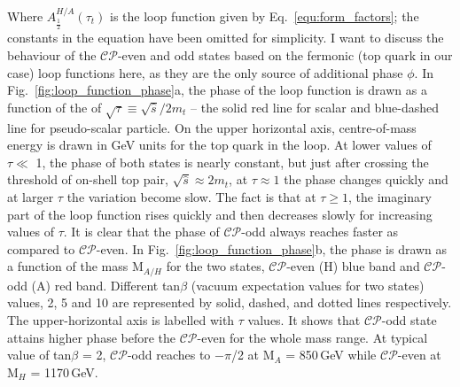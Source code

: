 Where $A^{H/A}_{\frac{1}{2}}(\tau_{t})$ is the loop function given by Eq.~\ref{equ:form_factors}; the constants in the equation have been omitted for simplicity. I want to discuss the behaviour of the $\mathcal{CP}$-even and odd states based on the fermonic (top quark in our case) loop functions here, as they are the only source of additional phase $\phi$. In Fig.~\ref{fig:loop_function_phase}a, the phase of the loop function is drawn as a function of the of $\sqrt{\tau}\equiv \sqrt{\hat{s}}/2m_{t}$ – the solid red line for scalar and blue-dashed line for pseudo-scalar particle. On the upper horizontal axis, centre-of-mass energy is drawn in GeV units for the top quark in the loop. At lower values of $\tau \ll$ 1, the phase of both states is nearly constant, but just after crossing the threshold of on-shell top pair, $\sqrt{\hat{s}} \approx 2m_{t}$, at $\tau\approx 1$ the phase changes quickly and at larger $\tau$ the variation become slow. The fact is that at $\tau\geq 1$, the imaginary part of the loop function rises quickly and then decreases slowly for increasing values of $\tau$. It is clear that the phase of $\mathcal{CP}$-odd always reaches faster as compared to $\mathcal{CP}$-even. In Fig.~\ref{fig:loop_function_phase}b, the phase is drawn as a function of the mass M$_{A/H}$ for the two states, $\mathcal{CP}$-even (H) blue band and $\mathcal{CP}$-odd (A) red band. Different tan$\beta$ (vacuum expectation values for two states) values, 2, 5 and 10 are represented by solid, dashed, and dotted lines respectively. The upper-horizontal axis is labelled with $\tau$ values. It shows that $\mathcal{CP}$-odd state attains higher phase before the $\mathcal{CP}$-even for the whole mass range. At typical value of tan$\beta$ = 2, $\mathcal{CP}$-odd reaches to $-\pi$/2 at M$_{A}$ = 850\,GeV while $\mathcal{CP}$-even at M$_{H}$ = 1170\,GeV.    
